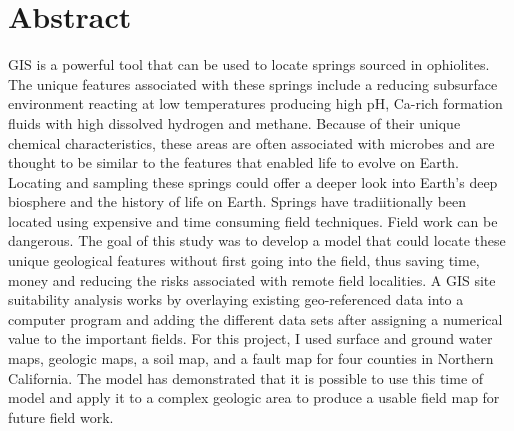 \chapter*{Abstract}
GIS is a powerful tool that can be used to locate springs sourced in ophiolites. The unique features associated with these springs include a reducing subsurface environment reacting at low temperatures producing high pH, Ca-rich formation fluids with high dissolved hydrogen and methane. Because of their unique chemical characteristics, these areas are often associated with microbes and are thought to be similar to the features that enabled life to evolve on Earth. Locating and sampling these springs could offer a deeper look into Earth's deep biosphere and the history of life on Earth. Springs have tradiitionally been located using expensive and time consuming field techniques. Field work can be dangerous. The goal of this study was to develop a model that could locate these unique geological features without first going into the field, thus saving time, money and reducing the risks associated with remote field localities. A GIS site suitability analysis works by overlaying existing geo-referenced data into a computer program and adding the different data sets after assigning a numerical value to the important fields. For this project, I used surface and ground water maps, geologic maps, a soil map, and a fault map for four counties in Northern California. The model has demonstrated that it is possible to use this time of model and apply it to a complex geologic area to produce a usable field map for future field work.